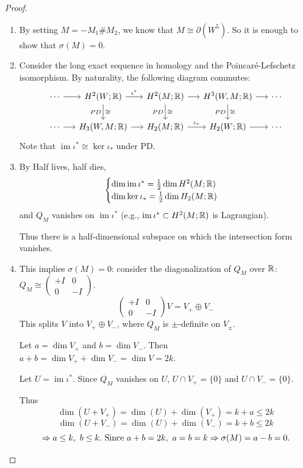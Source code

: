 \documentclass[main]{subfiles}
\begin{document}
\begin{proof}
\begin{enumerate}
	\item By setting $M = -M_1\#M_2$, we know that $M \cong \partial(W^5)$. So it is enough to show that $\sigma(M) = 0$.
	\item Consider the long exact sequence in homology and the Poincar\'e-Lefschetz isomorphism. By naturality, the following diagram commutes:
	\[
	\begin{tikzcd}[column sep=1.4em]
	\cdots \arrow[r] & H^2(W;\RR) \arrow[r, "\iota^\ast"] \arrow[d, "PD"', "\cong"] & H^2(M;\RR) \arrow[r] \arrow[d, "PD"', "\cong"] & H^3(W,M;\RR) \arrow[r] \arrow[d, "PD"', "\cong"] & \cdots \\
	\cdots \arrow[r] & H_3(W,M;\RR) \arrow[r] & H_2(M;\RR) \arrow[r, "\iota_\ast"] & H_2(W;\RR) \arrow[r] & \cdots
	\end{tikzcd}
	\]
	Note that $\operatorname{im}\iota^\ast \cong \ker\iota_\ast$ under PD.
	\item By Half lives, half dies,
	\[
	\begin{cases}
	\dim \operatorname{im} \iota^\ast = \tfrac12 \dim H^2(M;\mathbb R) \\
	\dim \operatorname{ker} \iota_\ast = \tfrac12 \dim H_2(M;\mathbb R)
	\end{cases}
	\]
	and $Q_M$ vanishes on $\operatorname{im}\iota^\ast$ (e.g., $\operatorname{im}\iota^\ast \subset H^2(M;\mathbb R)$ is Lagrangian).

	Thus there is a half-dimensional subspace on which the intersection form vanishes.
	\item This implies $\sigma(M)=0$: consider the diagonalization of $Q_M$ over $\mathbb R$: $Q_M \cong \begin{pmatrix}+I & 0 \\ 0 & -I\end{pmatrix}$.
	\[
	\begin{pmatrix}+I & 0 \\ 0 & -I\end{pmatrix} V = V_+ \oplus V_-
	\]
	This splits $V$ into $V_+\oplus V_-$, where $Q_M$ is $\pm$-definite on $V_\pm$.

	Let $a = \dim V_+$ and $b = \dim V_-$. Then $a+b = \dim V_+ + \dim V_- = \dim V = 2k$.

	Let $U = \operatorname{im}\iota^\ast$. Since $Q_M$ vanishes on $U$, $U\cap V_+ = \{0\}$ and $U\cap V_- = \{0\}$.

	Thus
	\[
	\dim(U+V_+) = \dim(U) + \dim(V_+) = k+a \leq 2k
	\]
	\[
	\dim(U+V_-) = \dim(U) + \dim(V_-) = k+b \leq 2k
	\]
	\[
	\Rightarrow a\leq k,\ b\leq k. \text{ Since } a+b=2k,\ a=b=k \Rightarrow \sigma(M) = a-b = 0. \qedhere
	\]
\end{enumerate}
\end{proof}
\end{document}
